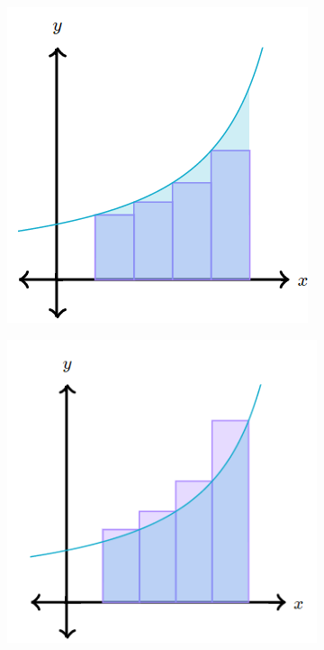 \documentclass{article}
\begin{document}
            \begin{figure}[hbt!]
                \centering
                \begin{subfigure}[b]{.45\textwidth}
                    \includegraphics[scale=0.8]{Resources/Unit4Integration/Riemann_Left}
                \end{subfigure}
                \begin{subfigure}[b]{.45\textwidth}
                    \includegraphics[scale=0.8]{Resources/Unit4Integration/Riemann_Right}
                \end{subfigure}
            \end{figure}
\end{document}
